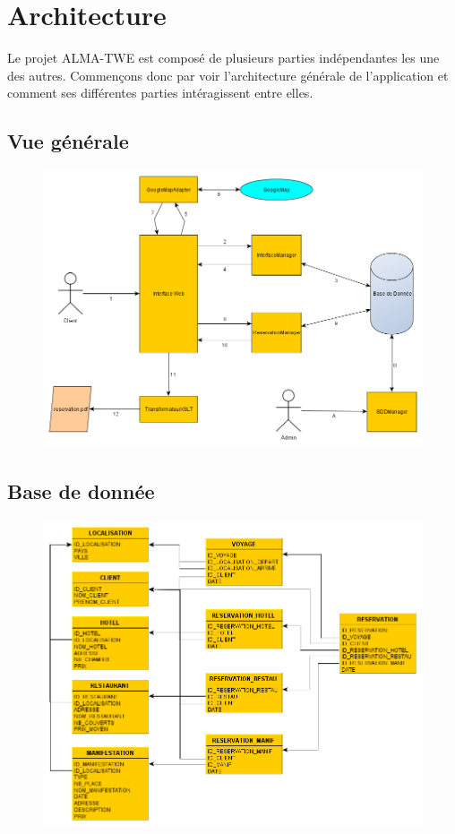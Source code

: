 \chapter{Architecture}

	Le projet ALMA-TWE est composé de plusieurs parties indépendantes les une des
	autres. Commençons donc par voir l'architecture générale de l'application et
	comment ses différentes parties intéragissent entre elles.

	\section{Vue générale}
	
		\begin{figure}[!h]
			\centering
			\includegraphics[width=1\textwidth]{overview}
			\label{overview}
		\end{figure}
		
	\section{Base de donnée}
		
		\begin{figure}[!h]
			\centering
			\includegraphics[width=1\textwidth]{bdd}
			\label{bdd}
		\end{figure}
		
